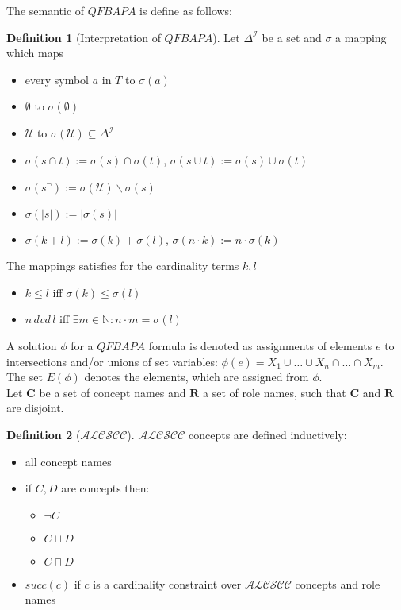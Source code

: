 \documentclass[a4paper,11pt]{scrartcl}
\theoremstyle{break}
\theoremstyle{definition}
\newtheorem{mydef}{Definition}
\begin{document}
The semantic of $QFBAPA$ is define as follows:
\begin{mydef}[Interpretation of $QFBAPA$]
Let $\Delta^\mathcal{I}$ be a set and $\sigma$ a mapping which maps
\begin{itemize}
\item every symbol $a$ in $T$ to $\sigma(a)$
\item $\emptyset$ to $\sigma(\emptyset)$
\item $\mathcal{U}$ to $\sigma(\mathcal{U})\subseteq \Delta^\mathcal{I}$
\item $\sigma(s\cap t):= \sigma(s)\cap \sigma(t)$, $\sigma(s\cup t):= \sigma(s)\cup \sigma(t)$
\item $\sigma(s^\neg):=\sigma(\mathcal{U})\backslash \sigma(s)$
\item $\sigma(|s|):=|\sigma(s)|$
\item $\sigma(k+l):=\sigma(k)+\sigma(l)$, $\sigma(n\cdot k):= n\cdot \sigma(k)$
\end{itemize}
The mappings satisfies for the cardinality terms $k,l$
\begin{itemize}
\item $k\leq l$ iff $\sigma(k)\leq \sigma(l)$
\item $n\,dvd\,l$ iff $\exists m\in\mathbb{N}:n\cdot m = \sigma(l)$
\end{itemize}
\end{mydef}
A solution $\phi$ for a $QFBAPA$ formula is denoted as assignments of elements $e$ to intersections and/or unions of set variables: $\phi(e)=X_1\cup\dots\cup X_n\cap\dots\cap X_m$. The set $E(\phi)$ denotes the elements, which are assigned from $\phi$.\\
Let $\mathbf{C}$ be a set of concept names and $\mathbf{R}$ a set of role names, such that $\mathbf{C}$ and $\mathbf{R}$ are disjoint.
\begin{mydef}[$\mathcal{ALCSCC}$]
$\mathcal{ALCSCC}$ concepts are defined inductively:
\begin{itemize}
\item all concept names
\item if $C,D$ are concepts then:
\begin{itemize}
\item $\neg C$
\item $C\sqcup D$
\item $C\sqcap D$
\end{itemize}
\item $succ(c)$ if $c$ is a cardinality constraint over $\mathcal{ALCSCC}$ concepts and role names
\end{itemize}
\end{mydef}
\end{document}
